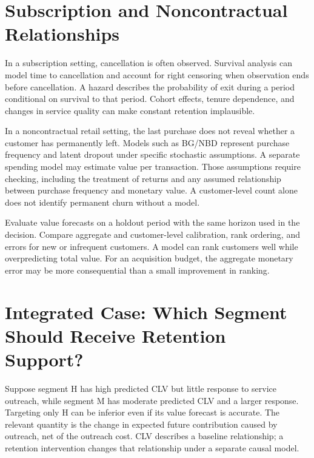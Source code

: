\hypertarget{M04-subscription-and-noncontractual-relationships}{%
\section{Subscription and Noncontractual
Relationships}\label{M04-subscription-and-noncontractual-relationships}}

\noindent In a subscription setting, cancellation is often observed. Survival
analysis can model time to cancellation and account for right censoring
when observation ends before cancellation. A hazard describes the
probability of exit during a period conditional on survival to that
period. Cohort effects, tenure dependence, and changes in service
quality can make constant retention implausible.

In a noncontractual retail setting, the last purchase does not reveal
whether a customer has permanently left. Models such as BG/NBD represent
purchase frequency and latent dropout under specific stochastic
assumptions. A separate spending model may estimate value per
transaction. Those assumptions require checking, including the treatment
of returns and any assumed relationship between purchase frequency and
monetary value. A customer-level count alone does not identify permanent
churn without a model.

Evaluate value forecasts on a holdout period with the same horizon used
in the decision. Compare aggregate and customer-level calibration, rank
ordering, and errors for new or infrequent customers. A model can rank
customers well while overpredicting total value. For an acquisition
budget, the aggregate monetary error may be more consequential than a
small improvement in ranking.

\hypertarget{M04-integrated-case-which-segment-should-receive-retention-support}{%
\section{Integrated Case: Which Segment Should Receive Retention
Support?}\label{M04-integrated-case-which-segment-should-receive-retention-support}}

\noindent Suppose segment H has high predicted CLV but little response to service
outreach, while segment M has moderate predicted CLV and a larger
response. Targeting only H can be inferior even if its value forecast is
accurate. The relevant quantity is the change in expected future
contribution caused by outreach, net of the outreach cost. CLV describes
a baseline relationship; a retention intervention changes that
relationship under a separate causal model.

